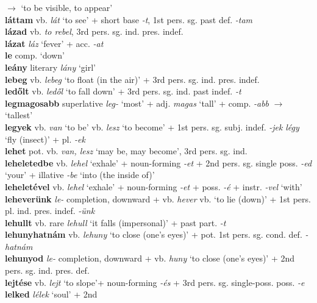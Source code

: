 \documentclass[11pt]{article}
\begin{document}
$\rightarrow$ `to be visible, to appear' \\
\textbf{láttam} vb. \emph{lát} `to see' + short base \emph{-t}, 1st
pers. sg. past def. \emph{-tam} \\
\textbf{lázad} vb. \emph{to rebel}, 3rd pers. sg. ind. pres. indef. \\
\textbf{lázat} \emph{láz} `fever' + acc. \emph{-at} \\
\textbf{le} comp. `down' \\
\textbf{leány} literary \emph{lány} `girl' \\
\textbf{lebeg} vb. \emph{lebeg} `to float (in the air)' + 3rd
  pers. sg. ind. pres. indef. \\
\textbf{ledőlt} vb. \emph{ledől} `to fall down' + 3rd
pers. sg. ind. past indef. \emph{-t} \\
\textbf{legmagosabb} superlative \emph{leg-} `most' +
adj. \emph{magas} `tall' + comp. \emph{-abb} $\rightarrow$
`tallest' \\
\textbf{legyek} vb. \emph{van} `to be' \textbar\textbar{}
vb. \emph{lesz} `to become' + 1st
pers. sg. subj. indef. \emph{-jek} \textbar\textbar{} \emph{légy} `fly
(insect)' + pl. \emph{-ek} \\
\textbf{lehet} pot. vb. \emph{van, lesz} `may be, may become', 3rd
pers. sg. ind. \\
\textbf{leheletedbe} vb. \emph{lehel} `exhale' +
noun\hyp{}forming \emph{-et} + 2nd pers. sg. single
poss. \emph{-ed} `your' + illative \emph{-be}
`into (the inside of)' \\
\textbf{leheletével} vb. \emph{lehel} `exhale' +
noun\hyp{}forming \emph{-et} + poss. \emph{-é} + instr. \emph{-vel} `with' \\
\textbf{leheverünk} \emph{le-} completion, downward +
vb. \emph{hever} vb. `to lie (down)' + 1st
pers. pl. ind. pres. indef. \emph{-ünk} \\
\textbf{lehullt} vb. rare \emph{lehull} `it falls (impersonal)' + past
part. \emph{-t} \\
\textbf{lehunyhatnám} vb. \emph{lehuny} `to close (one's eyes)' + pot. 1st pers. sg. cond. def. \emph{-hatnám} \\
\textbf{lehunyod} \emph{le-} completion, downward +
vb. \emph{huny} `to close (one's eyes)' + 2nd
pers. sg. ind. pres. def. \\
\textbf{lejtése} vb. \emph{lejt} `to slope'+
noun\hyp{}forming \emph{-és} + 3rd
pers. sg. single\hyp{}poss. poss. \emph{-e} \\
\textbf{lelked} \emph{lélek} `soul' + 2nd
\end{document}
